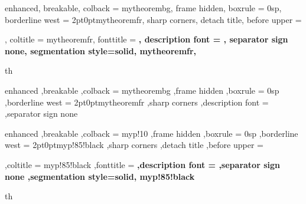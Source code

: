 
\setlength{\parindent}{1cm}

{%
	enhanced,
	breakable,
	colback = mytheorembg,
	frame hidden,
	boxrule = 0sp,
	borderline west = {2pt}{0pt}{mytheoremfr},
	sharp corners,
	detach title,
	before upper = \tcbtitle\par\smallskip,
	coltitle = mytheoremfr,
	fonttitle = \bfseries\sffamily,
	description font = \mdseries,
	separator sign none,
	segmentation style={solid, mytheoremfr},
}
{th}



{%
	enhanced
	,breakable
	,colback = mytheorembg
	,frame hidden
	,boxrule = 0sp
	,borderline west = {2pt}{0pt}{mytheoremfr}
	,sharp corners
	,description font = \mdseries
	,separator sign none
}

{%
	enhanced
	,breakable
	,colback = myp!10
	,frame hidden
	,boxrule = 0sp
	,borderline west = {2pt}{0pt}{myp!85!black}
	,sharp corners
	,detach title
	,before upper = \tcbtitle\par\smallskip
	,coltitle = myp!85!black
	,fonttitle = \bfseries\sffamily
	,description font = \mdseries
	,separator sign none
	,segmentation style={solid, myp!85!black}
}
{th}


